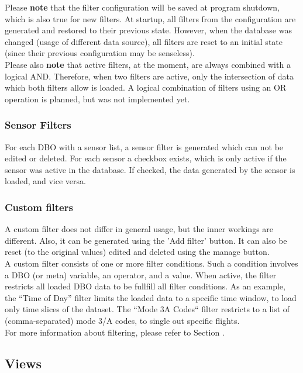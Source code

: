 \documentclass[10pt,letterpaper,extrafontsizes]{memoir}
\begin{document}
Please \textbf{note} that the filter configuration will be saved at program shutdown, which is also true for new
filters.   At  startup,  all  filters  from  the  configuration  are  generated  and  restored  to  their  previous  state. However, when the database was changed (usage of different data source), all filters are reset to an initial
state (since their previous configuration may be senseless). \\

Please also \textbf{note} that active filters, at the moment, are always combined with a logical AND. Therefore,
when  two  filters  are  active,  only  the  intersection  of  data  which  both  filters  allow  is  loaded.   A  logical combination of filters using an OR operation is planned, but was not implemented yet.

\subsubsection{Sensor Filters}
For each DBO with a sensor list, a sensor filter is generated which can not be edited or deleted.  For each
sensor a checkbox exists, which is only active if the sensor was active in the database.  If checked, the
data generated by the sensor is loaded, and vice versa.

\subsubsection{Custom filters}
A  custom  filter  does  not  differ  in  general  usage,  but  the  inner  workings  are  different.   Also,  it  can  be generated using the 'Add filter' button. It can also be reset (to the original values) edited and deleted using
the manage button. \\
A custom filter consists of one or more filter conditions.  Such a condition involves a DBO (or meta) variable, an operator, and a value.  When active, the filter restricts all loaded DBO data to be fullfill all filter conditions.
As an example, the ``Time of Day'' filter limits the loaded data to a specific time window, to load only time slices of the dataset.  The ``Mode 3A Codes`` filter restricts to a list of (comma-separated) mode 3/A codes, to single out specific flights. \\

For more information about filtering, please refer to Section .

\subsection{Views}
\end{document}

